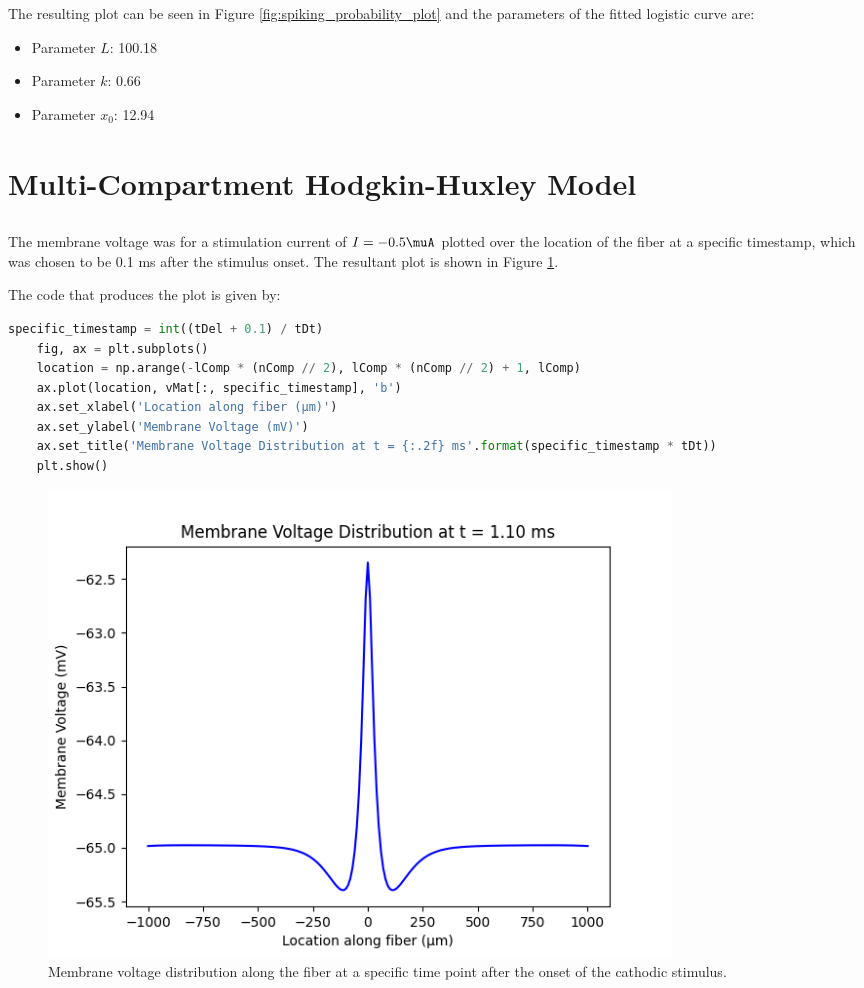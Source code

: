 \documentclass{article}
\begin{document}
    The resulting plot can be seen in Figure \ref{fig:spiking_probability_plot} and the parameters of the fitted logistic curve are:

    \begin{itemize}
        \item Parameter \(L\): 100.18
        \item Parameter \(k\): 0.66
        \item Parameter \(x_0\): 12.94
    \end{itemize}


    \section{Multi-Compartment Hodgkin-Huxley Model}

    \subsection{}
    The membrane voltage was for a stimulation current of \( I = -0.5 \muA \) plotted over the location of the fiber at a specific timestamp, which was chosen to be 0.1 ms after the stimulus onset.
    The resultant plot is shown in Figure \ref{fig:membrane_voltage}.

    \vspace{10pt}
    The code that produces the plot is given by:

    \begin{lstlisting}[language=Python, style=mystyle]
    specific_timestamp = int((tDel + 0.1) / tDt)
    fig, ax = plt.subplots()
    location = np.arange(-lComp * (nComp // 2), lComp * (nComp // 2) + 1, lComp)
    ax.plot(location, vMat[:, specific_timestamp], 'b')
    ax.set_xlabel('Location along fiber (μm)')
    ax.set_ylabel('Membrane Voltage (mV)')
    ax.set_title('Membrane Voltage Distribution at t = {:.2f} ms'.format(specific_timestamp * tDt))
    plt.show()
    \end{lstlisting}

    \begin{figure}[h]
        \centering
        \includegraphics[width=0.8\textwidth]{membrane_voltage}
        \caption{Membrane voltage distribution along the fiber at a specific time point after the onset of the cathodic stimulus.}
        \label{fig:membrane_voltage}
    \end{figure}
\end{document}
